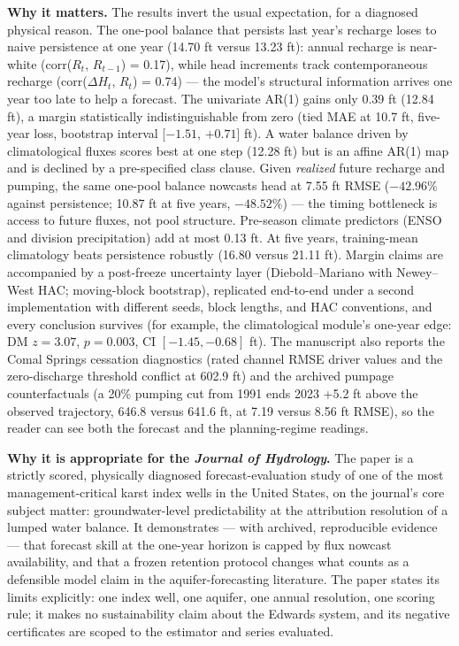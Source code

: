\documentclass[11pt]{article}
\begin{document}
\textbf{Why it matters.} The results invert the usual expectation, for a
diagnosed physical reason. The one-pool balance that persists last
year's recharge loses to naive persistence at one year (14.70 ft versus
13.23 ft): annual recharge is near-white (corr(\(R_t\), \(R_{t-1}\)) =
0.17), while head increments track contemporaneous recharge
(corr(\(\Delta H_t\), \(R_t\)) = 0.74) --- the model's structural
information arrives one year too late to help a forecast. The univariate
AR(1) gains only 0.39 ft (12.84 ft), a margin statistically
indistinguishable from zero (tied MAE at 10.7 ft, five-year loss,
bootstrap interval {[}\(-1.51\), \(+0.71\){]} ft). A water balance
driven by climatological fluxes scores best at one step (12.28 ft) but
is an affine AR(1) map and is declined by a pre-specified class clause.
Given \emph{realized} future recharge and pumping, the same one-pool
balance nowcasts head at 7.55 ft RMSE (\(-42.96\%\) against persistence;
10.87 ft at five years, \(-48.52\%\)) --- the timing bottleneck is
access to future fluxes, not pool structure. Pre-season climate
predictors (ENSO and division precipitation) add at most 0.13 ft. At
five years, training-mean climatology beats persistence robustly (16.80
versus 21.11 ft). Margin claims are accompanied by a post-freeze
uncertainty layer (Diebold--Mariano with Newey--West HAC; moving-block
bootstrap), replicated end-to-end under a second implementation with
different seeds, block lengths, and HAC conventions, and every
conclusion survives (for example, the climatological module's one-year
edge: DM \(z = 3.07\), \(p = 0.003\), CI \([-1.45, -0.68]\) ft). The
manuscript also reports the Comal Springs cessation diagnostics (rated
channel RMSE driver values and the zero-discharge threshold conflict at
602.9 ft) and the archived pumpage counterfactuals (a 20\% pumping cut
from 1991 ends 2023 +5.2 ft above the observed trajectory, 646.8 versus
641.6 ft, at 7.19 versus 8.56 ft RMSE), so the reader can see both the
forecast and the planning-regime readings.

\textbf{Why it is appropriate for the \emph{Journal of Hydrology}.} The
paper is a strictly scored, physically diagnosed forecast-evaluation
study of one of the most management-critical karst index wells in the
United States, on the journal's core subject matter: groundwater-level
predictability at the attribution resolution of a lumped water balance.
It demonstrates --- with archived, reproducible evidence --- that
forecast skill at the one-year horizon is capped by flux nowcast
availability, and that a frozen retention protocol changes what counts
as a defensible model claim in the aquifer-forecasting literature. The
paper states its limits explicitly: one index well, one aquifer, one
annual resolution, one scoring rule; it makes no sustainability claim
about the Edwards system, and its negative certificates are scoped to
the estimator and series evaluated.
\end{document}
